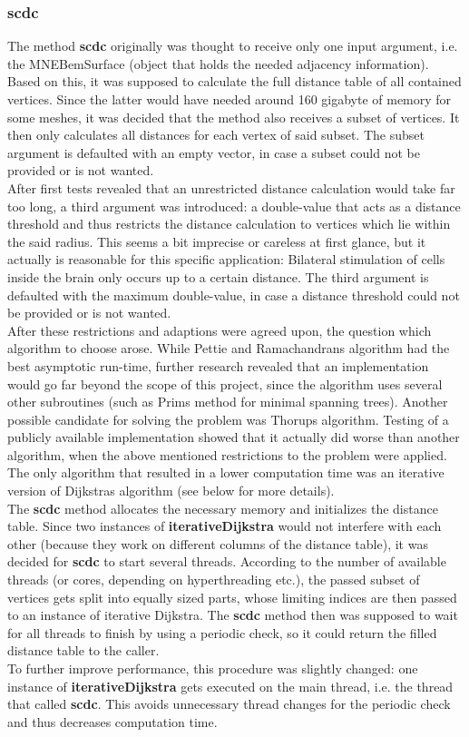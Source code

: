 \subsubsection{scdc}
The method \textbf{scdc} originally was thought to receive only one input argument, i.e. the MNEBemSurface (object that holds the needed adjacency information). Based on this, it was supposed to calculate the full distance table of all contained vertices. Since the latter would have needed around 160 gigabyte of memory for some meshes, it was decided that the method also receives a subset of vertices. It then only calculates all distances for each vertex of said subset. The subset argument is defaulted with an empty vector, in case a subset could not be provided or is not wanted.\\
After first tests revealed that an unrestricted distance calculation would take far too long, a third argument was introduced: a double-value that acts as a distance threshold and thus restricts the distance calculation to vertices which lie within the said radius. This seems a bit imprecise or careless at first glance, but it actually is reasonable for this specific application: Bilateral stimulation of cells inside the brain only occurs up to a certain distance. The third argument is defaulted with the maximum double-value, in case a distance threshold could not be provided or is not wanted.\\
After these restrictions and adaptions were agreed upon, the question which algorithm to choose arose.
While Pettie and Ramachandrans algorithm had the best asymptotic run-time, further research revealed that an implementation would go far beyond the scope of this project, since the algorithm uses several other subroutines (such as Prims method for minimal spanning trees). Another possible candidate for solving the problem was Thorups algorithm. Testing of a publicly available implementation showed that it actually did worse than another algorithm, when the above mentioned restrictions to the problem were applied. The only algorithm that resulted in a lower computation time was an iterative version of Dijkstras algorithm (see below for more details).\\
The \textbf{scdc} method allocates the necessary memory and initializes the distance table.
Since two instances of \textbf{iterativeDijkstra} would not interfere with each other (because they work on different columns of the distance table), it was decided for \textbf{scdc} to start several threads. According to the number of available threads (or cores, depending on hyperthreading etc.), the passed subset of vertices gets split into equally sized parts, whose limiting indices are then passed to an instance of iterative Dijkstra. The \textbf{scdc} method then was supposed to wait for all threads to finish by using a periodic check, so it could return the filled distance table to the caller.\\
To further improve performance, this procedure was slightly changed: one instance of \textbf{iterativeDijkstra} gets executed on the main thread, i.e. the thread that called \textbf{scdc}. This avoids unnecessary thread changes for the periodic check and thus decreases computation time.

